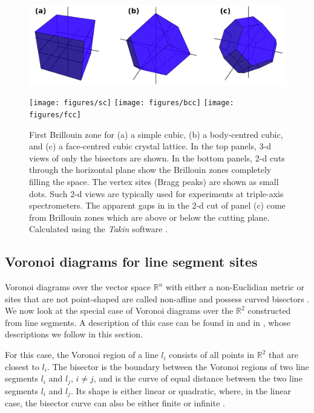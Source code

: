 \begin{figure}[h]
	\begin{center}
		\includegraphics[width = 0.95 \textwidth]{figures/bz}

		\vspace{0.5cm}
		\texttt{[image: figures/sc]}
		\hspace{2.2cm}
		\texttt{[image: figures/bcc]}
		\hspace{2.2cm}
		\texttt{[image: figures/fcc]}
	\end{center}
	\caption[Brillouin zones.]{
		First Brillouin zone for
			(a) a simple cubic,
			(b) a body-centred cubic, and
			(c) a face-centred cubic crystal lattice.
		In the top panels, 3-d views of only the bisectors are shown.
		In the bottom panels, 2-d cuts through the horizontal plane show the Brillouin zones 
		completely filling the space. The vertex sites (Bragg peaks) are shown as small dots.
		Such 2-d views are typically used for experiments at triple-axis spectrometers.
		The apparent gaps in in the 2-d cut of panel (c) come from Brillouin zones which are 
		above or below the cutting plane.
		Calculated using the \textit{Takin} software \cite{Takin2021, Takin2017, Takin2016}.
		\label{fig:cubic_bzs}}
\end{figure}



\subsection{Voronoi diagrams for line segment sites}
\label{sec:voro_ls}
Voronoi diagrams over the vector space $\mathbb{R}^n$ with either a non-Euclidian metric or sites that
are not point-shaped are called non-affine and possess curved bisectors \cite[p. 72]{Boissonnat2006}.
We now look at the special case of Voronoi diagrams over the $\mathbb{R}^2$ constructed from line segments.
A description of this case can be found in \cite[Ch. 7.3, pp. 160-163]{Berg2008} and in 
\cite[pp. 242-247]{FUH_geo2020}, whose descriptions we follow in this section.

For this case, the Voronoi region of a line $l_i$ consists of all points in $\mathbb{R}^2$ that 
are closest to $l_i$. The bisector is the boundary between the Voronoi regions of two line segments 
$l_i$ and $l_j$, $i \neq j$,
and is the curve of equal distance between the two line segments $l_i$ and $l_j$.
Its shape is either linear or quadratic, where, in the linear case, the bisector curve can also be either
finite or infinite \cite[pp. 243-244]{FUH_geo2020}.

